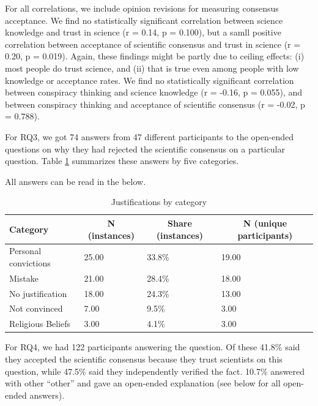 \documentclass[
  doc,floatsintext]{apa6}
\begin{document}
For all correlations, we include opinion revisions for measuring consensus acceptance. We find no statistically significant correlation between science knowledge and trust in science (r = 0.14, p = 0.100), but a samll positive correlation between acceptance of scientific consensus and trust in science (r = 0.20, p = 0.019). Again, these findings might be partly due to ceiling effects: (i) most people do trust science, and (ii) that is true even among people with low knowledge or acceptance rates. We find no statistically significant correlation between conspiracy thinking and science knowledge (r = -0.16, p = 0.055), and between conspiracy thinking and acceptance of scientific consensus (r = -0.02, p = 0.788).

For RQ3, we got 74 answers from 47 different participants to the open-ended questions on why they had rejected the scientific consensus on a particular question. Table \ref{tab:exp3-justifications} summarizes these answers by five categories.

All answers can be read in the below.

\begin{table}[tbp]

\begin{center}
\begin{threeparttable}

\caption{\label{tab:exp3-justifications}Justifications by category}

\begin{tabular}{llll}
\toprule
Category & \multicolumn{1}{c}{N (instances)} & \multicolumn{1}{c}{Share (instances)} & \multicolumn{1}{c}{N (unique participants)}\\
\midrule
Personal convictions & 25.00 & 33.8\% & 19.00\\
Mistake & 21.00 & 28.4\% & 18.00\\
No justification & 18.00 & 24.3\% & 13.00\\
Not convinced & 7.00 & 9.5\% & 3.00\\
Religious Beliefs & 3.00 & 4.1\% & 3.00\\
\bottomrule
\end{tabular}

\end{threeparttable}
\end{center}

\end{table}

For RQ4, we had 122 participants answering the question. Of these 41.8\% said they accepted the scientific consensus because they trust scientists on this question, while 47.5\% said they independently verified the fact. 10.7\% answered with other ``other'' and gave an open-ended explanation (see below for all open-ended answers).
\end{document}

